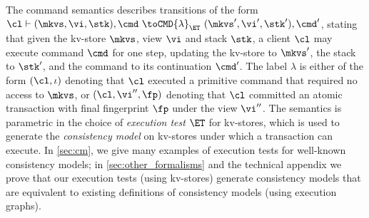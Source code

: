 %
The command semantics describes transitions of the form
$\cl \vdash (\mkvs, \vi, \stk), \cmd \ \toCMD{\lambda}_{\ET} \ (\mkvs', \vi', \stk') ,
\cmd'$, stating that given the kv-store $\mkvs$, view $\vi$ and stack $\stk$, 
a client $\cl$ may execute command $\cmd$ for one step, updating 
the kv-store to $\mkvs'$, the stack to $\stk'$, and the command to its continuation $\cmd'$.
The label $\lambda$ is either of the form $(\cl, \iota)$ denoting that $\cl$ executed a primitive command
that required no access to $\mkvs$, 
or $(\cl, \vi'', \fp)$ denoting that $\cl$ committed an atomic transaction with final fingerprint $\fp$ under the view $\vi''$.
The semantics is parametric in the choice of \emph{execution test}
$\ET$ for kv-stores, which is used to generate 
the \emph{consistency model} on kv-stores
under which a 
transaction can execute.
In \cref{sec:cm}, we give many examples of execution tests for well-known consistency models; 
in \cref{sec:other_formalisms} and the technical appendix we prove that our execution tests (using kv-stores) generate consistency models that are equivalent to existing definitions of
consistency models (using execution graphs). 

